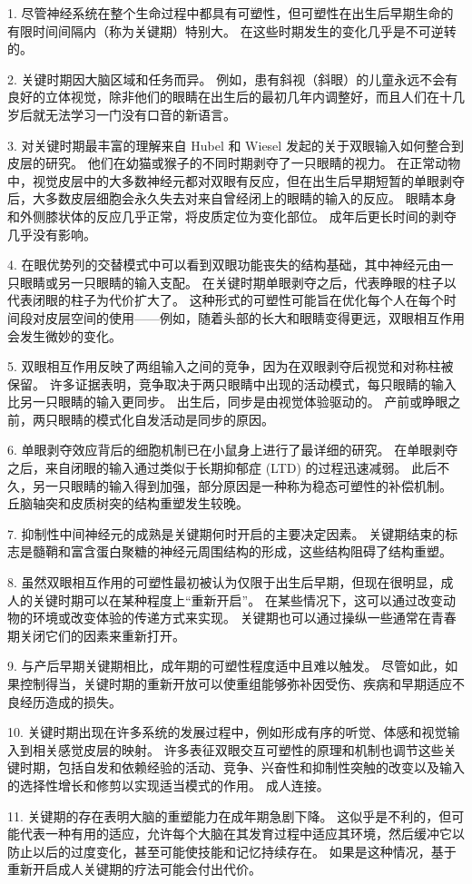 1. 尽管神经系统在整个生命过程中都具有可塑性，但可塑性在出生后早期生命的有限时间间隔内（称为关键期）特别大。
在这些时期发生的变化几乎是不可逆转的。


2. 关键时期因大脑区域和任务而异。
例如，患有斜视（斜眼）的儿童永远不会有良好的立体视觉，除非他们的眼睛在出生后的最初几年内调整好，而且人们在十几岁后就无法学习一门没有口音的新语言。


3. 对关键时期最丰富的理解来自 Hubel 和 Wiesel 发起的关于双眼输入如何整合到皮层的研究。
他们在幼猫或猴子的不同时期剥夺了一只眼睛的视力。
在正常动物中，视觉皮层中的大多数神经元都对双眼有反应，但在出生后早期短暂的单眼剥夺后，大多数皮层细胞会永久失去对来自曾经闭上的眼睛的输入的反应。
眼睛本身和外侧膝状体的反应几乎正常，将皮质定位为变化部位。
成年后更长时间的剥夺几乎没有影响。


4. 在眼优势列的交替模式中可以看到双眼功能丧失的结构基础，其中神经元由一只眼睛或另一只眼睛的输入支配。
在关键时期单眼剥夺之后，代表睁眼的柱子以代表闭眼的柱子为代价扩大了。
这种形式的可塑性可能旨在优化每个人在每个时间段对皮层空间的使用——例如，随着头部的长大和眼睛变得更远，双眼相互作用会发生微妙的变化。


5. 双眼相互作用反映了两组输入之间的竞争，因为在双眼剥夺后视觉和对称柱被保留。
许多证据表明，竞争取决于两只眼睛中出现的活动模式，每只眼睛的输入比另一只眼睛的输入更同步。
出生后，同步是由视觉体验驱动的。
产前或睁眼之前，两只眼睛的模式化自发活动是同步的原因。


6. 单眼剥夺效应背后的细胞机制已在小鼠身上进行了最详细的研究。
在单眼剥夺之后，来自闭眼的输入通过类似于长期抑郁症 (LTD) 的过程迅速减弱。
此后不久，另一只眼睛的输入得到加强，部分原因是一种称为稳态可塑性的补偿机制。
丘脑轴突和皮质树突的结构重塑发生较晚。


7. 抑制性中间神经元的成熟是关键期何时开启的主要决定因素。
关键期结束的标志是髓鞘和富含蛋白聚糖的神经元周围结构的形成，这些结构阻碍了结构重塑。


8. 虽然双眼相互作用的可塑性最初被认为仅限于出生后早期，但现在很明显，成人的关键时期可以在某种程度上“重新开启”。
在某些情况下，这可以通过改变动物的环境或改变体验的传递方式来实现。
关键期也可以通过操纵一些通常在青春期关闭它们的因素来重新打开。


9. 与产后早期关键期相比，成年期的可塑性程度适中且难以触发。
尽管如此，如果控制得当，关键时期的重新开放可以使重组能够弥补因受伤、疾病和早期适应不良经历造成的损失。


10. 关键时期出现在许多系统的发展过程中，例如形成有序的听觉、体感和视觉输入到相关感觉皮层的映射。
许多表征双眼交互可塑性的原理和机制也调节这些关键时期，包括自发和依赖经验的活动、竞争、兴奋性和抑制性突触的改变以及输入的选择性增长和修剪以实现适当模式的作用。 成人连接。


11. 关键期的存在表明大脑的重塑能力在成年期急剧下降。
这似乎是不利的，但可能代表一种有用的适应，允许每个大脑在其发育过程中适应其环境，然后缓冲它以防止以后的过度变化，甚至可能使技能和记忆持续存在。
如果是这种情况，基于重新开启成人关键期的疗法可能会付出代价。



